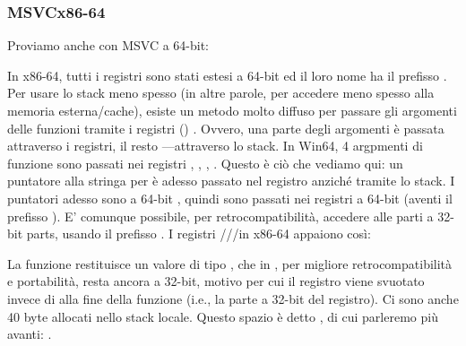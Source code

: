 \subsubsection{MSVC\EMDASH{}x86-64}

Proviamo anche con MSVC a 64-bit:




In x86-64, tutti i registri sono stati estesi a 64-bit ed il loro nome ha il prefisso .
Per usare lo stack meno spesso (in altre parole, per accedere meno spesso alla memoria esterna/cache), esiste un metodo molto diffuso per passare gli argomenti delle funzioni tramite i registri ()
.
Ovvero, una parte degli argomenti è passata attraverso i registri, il resto ---attraverso lo stack.
In Win64, 4 argpmenti di funzione sono passati nei registri \RCX, \RDX, , .
Questo è ciò che vediamo qui: un puntatore alla stringa per \printf è adesso passato nel registro \RCX anziché tramite lo stack.
I puntatori adesso sono a 64-bit , quindi sono passati nei registri a 64-bit (aventi il prefisso ).
E' comunque possibile, per retrocompatibilità, accedere alle parti a 32-bit parts, usando il prefisso .
I registri \RAX/\EAX/\AX/\AL in x86-64 appaiono così:


La funzione \main restituisce un valore di tipo \Tint{}, che in \CCpp, per migliore retrocompatibilità e portabilità, resta ancora a 32-bit, motivo per cui il registro \EAX viene svuotato invece di \RAX{} alla fine della funzione (i.e., la parte a 32-bit
del registro).
Ci sono anche 40 byte allocati nello stack locale.
Questo spazio è detto , di cui parleremo più avanti: .

